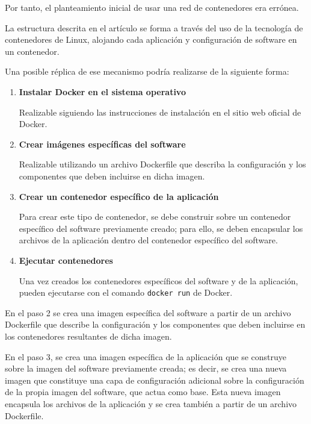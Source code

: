                 Por tanto, el planteamiento inicial de usar una red de contenedores era errónea.
                
                La estructura descrita en el artículo se forma a través del uso de la tecnología de contenedores de Linux, alojando cada aplicación y configuración de software en un contenedor.

                Una posible réplica de ese mecanismo podría realizarse de la siguiente forma:

                \begin{enumerate}

                    \item \textbf{Instalar Docker en el sistema operativo}
                    
                    Realizable siguiendo las instrucciones de instalación en el sitio web oficial de Docker.
                
                    \item \textbf{Crear imágenes específicas del software}
                    
                    Realizable utilizando un archivo Dockerfile que describa la configuración y los componentes que deben incluirse en dicha imagen.

                    \item \textbf{Crear un contenedor específico de la aplicación}

                    Para crear este tipo de contenedor, se debe construir sobre un contenedor específico del software previamente creado; para ello, se deben encapsular los archivos de la aplicación dentro del contenedor específico del software.

                    \item \textbf{Ejecutar contenedores}
                    
                    Una vez creados los contenedores específicos del software y de la aplicación, pueden ejecutarse con el comando \texttt{docker run} de Docker.

                \end{enumerate}

                En el paso 2 se crea una imagen específica del software a partir de un archivo Dockerfile que describe la configuración y los componentes que deben incluirse en los contenedores resultantes de dicha imagen.

                En el paso 3, se crea una imagen específica de la aplicación que se construye sobre la imagen del software previamente creada; es decir, se crea una nueva imagen que constituye una capa de configuración adicional sobre la configuración de la propia imagen del software, que actua como base. Esta nueva imagen encapsula los archivos de la aplicación y se crea también a partir de un archivo Dockerfile.

